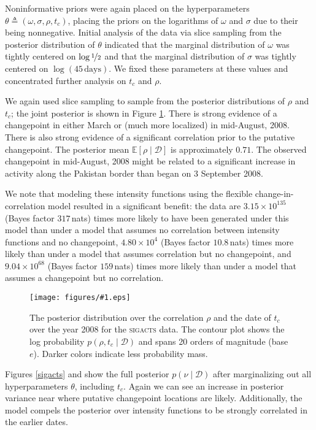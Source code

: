 \documentclass{article}
\newcommand{\deq}{\triangleq}
\newcommand{\psff}[1]{\texttt{[image: figures/\#1.eps]}}
\newcommand{\cm}[1]{\mathcal{#1}}
\newcommand{\data}{\cm{D}}
\newcommand{\given}{\mid}
\begin{document}
Noninformative priors were again placed on the hyperparameters $\theta
\deq (\omega, \sigma, \rho, t_c)$, placing the priors on the
logarithms of $\omega$ and $\sigma$ due to their being
nonnegative. Initial analysis of the data via slice sampling from the
posterior distribution of $\theta$ indicated that the marginal
distribution of $\omega$ was tightly centered on $\log
\nicefrac{1}{2}$ and that the marginal distribution of $\sigma$ was
tightly centered on $\log(45\, \text{days})$.  We fixed these parameters
at these values and concentrated further analysis on $t_c$ and $\rho$.

We again used slice sampling to sample from the posterior
distributions of $\rho$ and $t_c$; the joint posterior is shown in
Figure \ref{sigactsjoint}.  There is strong evidence of a changepoint
in either March or (much more localized) in mid-August, 2008.  There
is also strong evidence of a significant correlation prior to the
putative changepoint.  The posterior mean $\mathbb{E}[\rho \given
  \data]$ is approximately $0.71$.  The observed changepoint in
mid-August, 2008 might be related to a significant increase in
activity along the Pakistan border than began on 3 September 2008.

We note that modeling these intensity functions using the flexible
change-in-correlation model resulted in a significant benefit: the
data are $3.15 \times 10^{135}$ (Bayes factor $317$\,nats) times more
likely to have been generated under this model than under a model that
assumes no correlation between intensity functions and no changepoint,
$4.80 \times 10^{4}$ (Bayes factor $10.8$\,nats) times more likely
than under a model that assumes correlation but no changepoint, and
$9.04 \times 10^{68}$ (Bayes factor $159$\,nats) times more likely
than under a model that assumes a changepoint but no correlation.

\begin{figure}
  \centering \psff{sigacts_posterior}
  \caption{The posterior distribution over the correlation $\rho$ and
    the date of $t_c$ over the year 2008 for the \textsc{sigacts}
    data.  The contour plot shows the log probability $p(\rho, t_c
    \given \data)$ and spans 20 orders of magnitude (base $e$).  
    Darker colors indicate less probability mass.
  }
  \label{sigactsjoint}
\end{figure}

Figures \ref{sigacts} and  show the
full posterior $p(\nu \given \data)$ after marginalizing out all
hyperparameters $\theta$, including $t_c$.  Again we can see an
increase in posterior variance near where putative changepoint
locations are likely.  Additionally, the model compels the posterior
over intensity functions to be strongly correlated in the earlier
dates.
\end{document}

